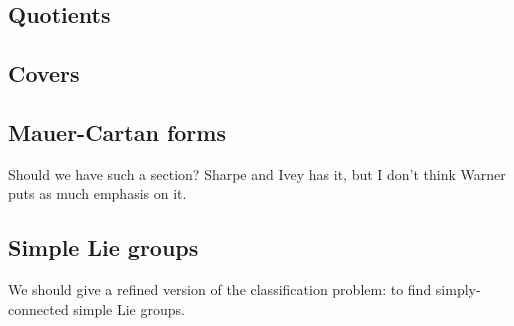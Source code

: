 \subsection{Quotients}


\subsection{Covers}


\subsection{Mauer-Cartan forms}
Should we have such a section? Sharpe and Ivey has it, but I don't think Warner puts as much emphasis on it.


\subsection{Simple Lie groups}
We should give a refined version of the classification problem: to find simply-connected simple Lie groups.
